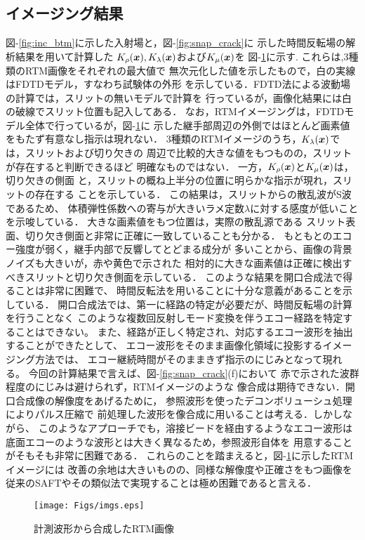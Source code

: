\subsection{イメージング結果}
{\rm 図}-\ref{fig:inc_btm}に示した入射場と，{\rm 図}-\ref{fig:snap_crack}に
示した時間反転場の解析結果を用いて計算した
$K_\rho(\boldsymbol{x}),K_{\lambda}(\boldsymbol{x})$および$K_{\mu}(\boldsymbol{x})$を
{図-}\ref{fig:imgs}に示す. これらは,3種類のRTM画像をそれぞれの最大値で
無次元化した値を示したもので，白の実線はFDTDモデル，すなわち試験体の外形
を示している．FDTD法による波動場の計算では，スリットの無いモデルで計算を
行っているが，画像化結果には白の破線でスリット位置も記入してある．
なお，RTMイメージングは，FDTDモデル全体で行っているが，{図-}\ref{fig:imgs}に
示した継手部周辺の外側ではほとんど画素値をもたず有意なし指示は現れない．
3種類のRTMイメージのうち，$K_\lambda(\boldsymbol{x})$では，スリットおよび切り欠きの
周辺で比較的大きな値をもつものの，スリットが存在すると判断できるほど
明確なものではない．
一方，$K_\rho(\boldsymbol{x})$と$K_{\mu}(\boldsymbol{x})$は，切り欠きの側面
と，スリットの概ね上半分の位置に明らかな指示が現れ，スリットの存在する
ことを示している．
この結果は，スリットからの散乱波がS波であるため、
体積弾性係数への寄与が大きいラメ定数$\lambda$に対する感度が低いことを示唆している．
大きな画素値をもつ位置は，実際の散乱源である
スリット表面、切り欠き側面と非常に正確に一致していることも分かる．
もともとのエコー強度が弱く，継手内部で反響してとどまる成分が
多いことから、画像の背景ノイズも大きいが，赤や黄色で示された
相対的に大きな画素値は正確に検出すべきスリットと切り欠き側面を示している．
このような結果を開口合成法で得ることは非常に困難で、
時間反転法を用いることに十分な意義があることを示している．
開口合成法では、第一に経路の特定が必要だが、時間反転場の計算を行うことなく
このような複数回反射しモード変換を伴うエコー経路を特定することはできない。
また、経路が正しく特定され、対応するエコー波形を抽出することができたとして、
エコー波形をそのまま画像化領域に投影するイメージング方法では、
エコー継続時間がそのままきず指示のにじみとなって現れる。
今回の計算結果で言えば、{\rm 図}-\ref{fig:snap_crack}(f)において
赤で示された波群程度のにじみは避けられず，RTMイメージのような
像合成は期待できない．開口合成像の解像度をあげるために，
参照波形を使ったデコンボリューシュ処理によりパルス圧縮で
前処理した波形を像合成に用いることは考える．しかしながら、
このようなアプローチでも，溶接ビードを経由するようなエコー波形は
底面エコーのような波形とは大きく異なるため，参照波形自体を
用意することがそもそも非常に困難である．
これらのことを踏まえると，{図-}\ref{fig:imgs}に示したRTMイメージには
改善の余地は大きいものの、同様な解像度や正確さをもつ画像を
従来のSAFTやその類似法で実現することは極め困難であると言える．
\begin{figure}[htb]
\centering
	\texttt{[image: Figs/imgs.eps]}
	\caption{計測波形から合成したRTM画像}
	\label{fig:imgs}
\end{figure}
